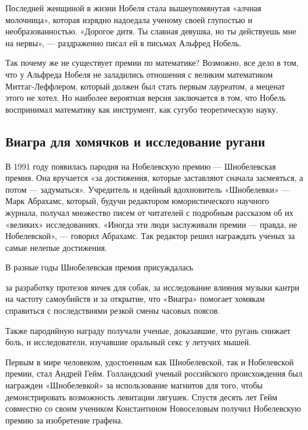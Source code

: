 Последней женщиной в жизни Нобеля стала вышеупомянутая «алчная молочница», которая изрядно надоедала ученому своей глупостью и необразованностью. «Дорогое дитя. Ты славная девушка, но ты действуешь мне на нервы», --- раздраженно писал ей в письмах Альфред Нобель.

Так почему же не существует премии по математике? Возможно, все дело в том, что у Альфреда Нобеля не заладились отношения с великим математиком Миттаг-Леффлером, который должен был стать первым лауреатом, а меценат этого не хотел. Но наиболее вероятная версия заключается в том, что Нобель воспринимал математику как инструмент, как сугубо теоретическую науку.

\subsection{Виагра для хомячков и исследование ругани}

В 1991 году появилась пародия на Нобелевскую премию --- Шнобелевская премия. Она вручается «за достижения, которые заставляют сначала засмеяться, а потом --- задуматься». Учредитель и идейный вдохновитель «Шнобелевки» --- Марк Абрахамс, который, будучи редактором юмористического научного журнала, получал множество писем от читателей с подробным рассказом об их «великих» исследованиях. «Иногда эти люди заслуживали премии --- правда, не Нобелевской», --- говорил Абрахамс. Так редактор решил награждать ученых за самые нелепые достижения.

В разные годы Шнобелевская премия присуждалась

за разработку протезов яичек для собак, за исследование влияния музыки кантри на частоту самоубийств и за открытие, что «Виагра» помогает хомякам справиться с последствиями резкой смены часовых поясов.

Также пародийную награду получали ученые, доказавшие, что ругань снижает боль, и исследователи, изучавшие оральный секс у летучих мышей.

Первым в мире человеком, удостоенным как Шнобелевской, так и Нобелевской премии, стал Андрей Гейм. Голландский ученый российского происхождения был награжден «Шнобелевкой» за использование магнитов для того, чтобы демонстрировать возможность левитации лягушек. Спустя десять лет Гейм совместно со своим учеником Константином Новоселовым получил Нобелевскую премию за изобретение графена.


